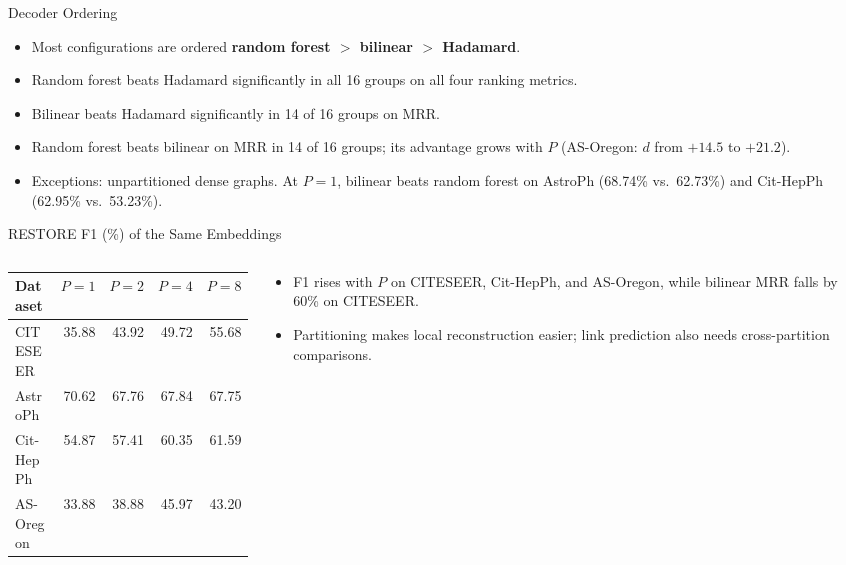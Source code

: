 \documentclass[aspectratio=169]{beamer}
\begin{document}
\begin{frame}{Decoder Ordering}
  \begin{itemize}
    \item Most configurations are ordered \textbf{random forest $>$ bilinear $>$ Hadamard}.
    \item Random forest beats Hadamard significantly in all 16 groups on all four ranking metrics.
    \item Bilinear beats Hadamard significantly in 14 of 16 groups on MRR.
    \item Random forest beats bilinear on MRR in 14 of 16 groups; its advantage grows with $P$ (AS-Oregon: $d$ from $+14.5$ to $+21.2$).
    \item Exceptions: unpartitioned dense graphs. At $P=1$, bilinear beats random forest on AstroPh (68.74\% vs.\ 62.73\%) and Cit-HepPh (62.95\% vs.\ 53.23\%).
  \end{itemize}
\end{frame}

\begin{frame}{RESTORE F1 (\%) of the Same Embeddings}
  \begin{columns}
    \begin{column}{0.55\textwidth}
      \centering
      \small
      \begin{tabular}{lrrrr}
        \toprule
        Dataset & $P{=}1$ & $P{=}2$ & $P{=}4$ & $P{=}8$ \\
        \midrule
        CITESEER  & 35.88 & 43.92 & 49.72 & 55.68 \\
        AstroPh   & 70.62 & 67.76 & 67.84 & 67.75 \\
        Cit-HepPh & 54.87 & 57.41 & 60.35 & 61.59 \\
        AS-Oregon & 33.88 & 38.88 & 45.97 & 43.20 \\
        \bottomrule
      \end{tabular}
    \end{column}
    \begin{column}{0.40\textwidth}
      \footnotesize
      \begin{itemize}
        \item F1 rises with $P$ on CITESEER, Cit-HepPh, and AS-Oregon, while bilinear MRR falls by 60\% on CITESEER.
        \item Partitioning makes local reconstruction easier; link prediction also needs cross-partition comparisons.
      \end{itemize}
    \end{column}
  \end{columns}
\end{frame}
\end{document}
